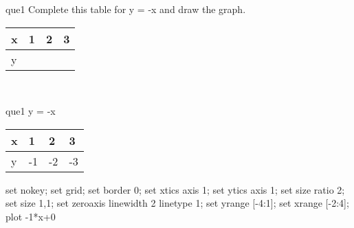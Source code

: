 \documentclass[13.5pt, varwidth=true]{beamer}
\begin{document}
\begin{frame}[shrink=19,fragile]
	\begin{beamercolorbox}[rounded=true, left, shadow=true,wd=14.8cm]{que1}
		 Complete this table for y = -x and draw the graph. \\[0.3cm] \renewcommand{\arraystretch}{1.2}\begin{tabular}{|C|C|C|C|} \hline x & 1 & 2 & 3 \\ \hline y & & & \\ \hline \end{tabular}\\[0.3cm]
	\end{beamercolorbox}
\end{frame}
\begin{frame}[shrink=19,fragile]
	\begin{beamercolorbox}[rounded=true, left, shadow=true,wd=14.8cm]{que1}
		y = -x\renewcommand{\arraystretch}{1.2}\begin{tabular}{|C|C|C|C|} \hline x & 1 & 2 & 3 \\ \hline y & -1 & -2 & -3\\ \hline \end{tabular}\begin{gnuplot}[terminal=pdf] set nokey; set grid; set border 0; set xtics axis 1; set ytics axis 1; set size ratio 2; set size 1,1; set zeroaxis linewidth 2 linetype 1; set yrange [-4:1]; set xrange [-2:4]; plot -1*x+0 \end{gnuplot}
	\end{beamercolorbox}
\end{frame}
\end{document}
